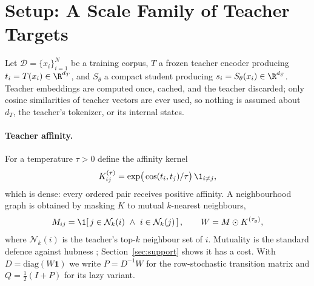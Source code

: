 \section{Setup: A Scale Family of Teacher Targets}
\label{sec:setup}

Let $\mathcal{D}=\{x_i\}_{i=1}^{N}$ be a training corpus, $T$ a frozen teacher encoder
producing $t_i = T(x_i)\in\R^{d_T}$, and $S_\theta$ a compact student producing
$s_i = S_\theta(x_i)\in\R^{d_S}$. Teacher embeddings are computed once, cached, and the
teacher discarded; only cosine similarities of teacher vectors are ever used, so nothing is
assumed about $d_T$, the teacher's tokenizer, or its internal states.

\paragraph{Teacher affinity.}
For a temperature $\tau>0$ define the affinity kernel
\begin{equation}
    K^{(\tau)}_{ij} = \exp\!\big(\cos(t_i,t_j)/\tau\big)\,\1_{i\neq j},
    \label{eq:kernel}
\end{equation}
which is dense: every ordered pair receives positive affinity. A neighbourhood graph is
obtained by masking $K$ to mutual $k$-nearest neighbours,
\begin{equation}
    M_{ij} = \1\!\left[\,j\in\mathcal{N}_k(i)\ \wedge\ i\in\mathcal{N}_k(j)\,\right],
    \qquad
    W = M \odot K^{(\tau_g)},
    \label{eq:graph}
\end{equation}
where $\mathcal{N}_k(i)$ is the teacher's top-$k$ neighbour set of $i$. Mutuality is the
standard defence against hubness \citep{radovanovic2010hubs}; Section~\ref{sec:support}
shows it has a cost. With $D=\mathrm{diag}(W\mathbf{1})$ we write $P = D^{-1}W$ for the
row-stochastic transition matrix and $Q = \tfrac{1}{2}(I + P)$ for its lazy variant.

